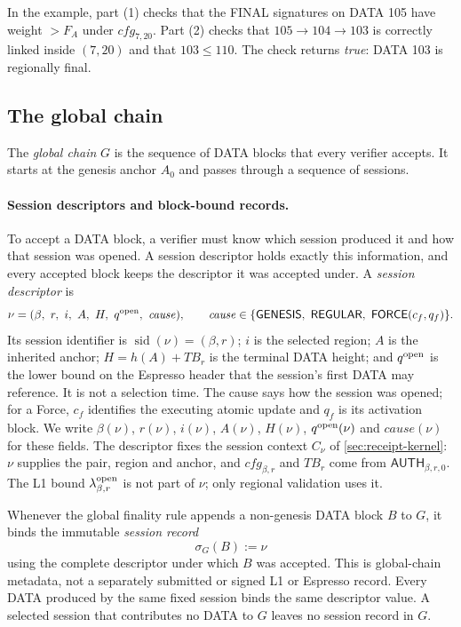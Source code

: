 \documentclass[11pt,a4paper]{article}
\newcommand{\TB}{\mathit{TB}}
\newcommand{\tagg}[1]{\ensuremath{\mathsf{#1}}}
\newcommand{\defterm}[1]{\textcolor{rrBlue}{\textit{#1}}}
\begin{document}
In the example, part (1) checks that the FINAL signatures on DATA 105
have weight $>F_A$ under $\mathit{cfg}_{7,20}$. Part (2) checks that
$105\to104\to103$ is correctly linked inside $(7,20)$ and that
$103\le110$. The check returns \emph{true}: DATA 103 is regionally final.



\subsection{The global chain}
\label{sec:global-finality}
\label{sec:global-chain}
The \defterm{global chain} $G$ is the sequence of DATA blocks that every
verifier accepts. It starts at the genesis anchor $A_0$ and passes
through a sequence of sessions.

\paragraph{Session descriptors and block-bound records.}
To accept a DATA block, a verifier must know which session produced it
and how that session was opened. A session descriptor holds exactly this
information, and every accepted block keeps the descriptor it was
accepted under. A \defterm{session descriptor} is
\[
 \nu=(\beta,\ r,\ i,\ A,\ H,\ q^{\rm open},\ \mathit{cause}),\qquad
 \mathit{cause}\in\{\tagg{GENESIS},\ \tagg{REGULAR},\
 \tagg{FORCE}(c_f,q_f)\}.
\]
Its session identifier is $\operatorname{sid}(\nu)=(\beta,r)$; $i$ is
the selected region; $A$ is the inherited anchor;
$H=h(A)+\TB_r$ is the terminal DATA height; and $q^{\rm open}$ is the
lower bound on the Espresso header that the session's first DATA may
reference. It is not a selection time. The cause says how the
session was opened; for a Force, $c_f$ identifies the executing atomic
update and $q_f$ is its activation block.  We write $\beta(\nu)$,
$r(\nu)$, $i(\nu)$,
$A(\nu)$, $H(\nu)$, $q^{\rm open}(\nu)$ and
$\mathit{cause}(\nu)$ for these fields.  The descriptor fixes the session context $C_\nu$
of \cref{sec:receipt-kernel}: $\nu$ supplies the pair, region and anchor,
and $\mathit{cfg}_{\beta,r}$ and $\TB_r$ come from $\tagg{AUTH}_{\beta,r,0}$.  The L1
bound $\lambda^{\rm open}_{\beta,r}$ is not part of $\nu$; only regional
validation uses it.

Whenever the global finality rule appends a non-genesis DATA block
$B$ to $G$, it binds the immutable \defterm{session record}
\[
 \sigma_G(B):=\nu
\]
using the complete descriptor under which $B$ was accepted. This is
global-chain metadata, not a separately submitted or signed L1 or
Espresso record.  Every DATA produced by the same fixed session binds
the same descriptor value.  A selected session that contributes no DATA
to $G$ leaves no session record in $G$.
\end{document}
